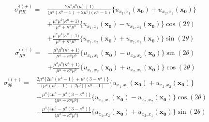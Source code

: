 \begin{align}
	\sigma_{RR}^{\epsilon(+)}
	=&\frac{ 2\mu^{a}\mu^{b}\bigl(\kappa^{a}+1\bigr)　}
		{\bigl(\mu^{a}(\kappa^{b}-1)+2\mu^{b}\bigr)(\kappa^{a}-1)}
	\bigl\{u_{x_{1},x_{1}}(\bm{x_{0}})+u_{x_{2},x_{2}}(\bm{x_{0}})\bigr\}
	\nonumber
	\\
	&+\frac{\mu^{a}\mu^{b}\bigl(\kappa^{a}+1\bigr)}{\mu^{a}+\kappa^{a}\mu^{b}}
	\bigl\{u_{x_{1},x_{1}}(\bm{x_{0}})-u_{x_{2},x_{2}}(\bm{x_{0}})\bigr\}\cos(2\theta)
	\nonumber
	\\
	&+\frac{\mu^{a}\mu^{b}\bigl(\kappa^{a}+1\bigr)}{\mu^{a}+\kappa^{a}\mu^{b}}
	\bigl\{u_{x_{1},x_{2}}(\bm{x_{0}})+u_{x_{2},x_{1}}(\bm{x_{0}})\bigr\}\sin(2\theta)
	\label{eq:eRROutEpsSol}
\end{align}
\begin{align}
	\sigma_{R\theta}^{\epsilon(+)}
	=&-\frac{\mu^{a}\mu^{b}\bigl(\kappa^{a}+1\bigr)}{\mu^{a}+\kappa^{a}\mu^{b}}
	\bigl\{u_{x_{1},x_{1}}(\bm{x_{0}})-u_{x_{2},x_{2}}(\bm{x_{0}})\bigr\}\sin(2\theta)
	\nonumber
	\\
	&+\frac{\mu^{a}\mu^{b}\bigl(\kappa^{a}+1\bigr)}{\mu^{a}+\kappa^{a}\mu^{b}}
	\bigl\{u_{x_{1},x_{2}}(\bm{x_{0}})+u_{x_{2},x_{1}}(\bm{x_{0}})\bigr\}\cos(2\theta)
	\label{eq:eRThOutEpsSol}
\end{align}
\begin{align}
	\sigma_{\theta\theta}^{\epsilon(+)}
	=&\frac{2\mu^{a}\bigl\{2\mu^{a}(\kappa^{b}-1)+\mu^{b}(3-\kappa^{a})\bigr\}}
	{\bigl(\mu^{a}(\kappa^{b}-1)+2\mu^{b}\bigr)(\kappa^{a}-1)}
	\bigl\{u_{x_{1},x_{1}}(\bm{x_{0}})+u_{x_{2},x_{2}}(\bm{x_{0}})\bigr\}
	\nonumber
	\\
	&-\frac{\mu^{a}\bigl\{4\mu^{a}-\mu^{b}(3-\kappa^{a})\bigr\}}
	{\bigl(\mu^{a}+\kappa^{a}\mu^{b}\bigr)}
	\bigl\{u_{x_{1},x_{1}}(\bm{x_{0}})-u_{x_{2},x_{2}}(\bm{x_{0}})\bigr\}\cos(2\theta)
	\nonumber
	\\
	&-\frac{\mu^{a}\bigl\{4\mu^{a}-\mu^{b}(3-\kappa^{a})\bigr\}}
	{\bigl(\mu^{a}+\kappa^{a}\mu^{b}\bigr)}
	\bigl\{u_{x_{1},x_{2}}(\bm{x_{0}})+u_{x_{2},x_{1}}(\bm{x_{0}})\bigr\}\sin(2\theta)
	\label{eq:eThThOutEpsSol}
\end{align}

\newpage

